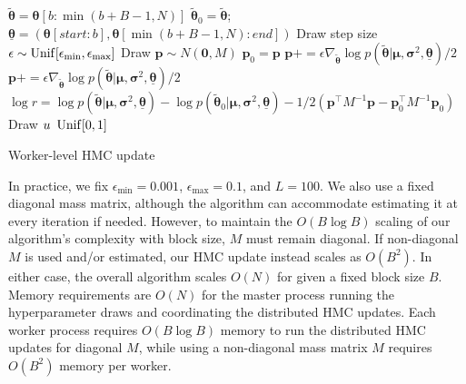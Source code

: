 \begin{algorithm}%

 $\bm{\tilde \theta} = \bm \theta[ b : \min(b + B - 1, N)]$\;
 $\bm{\tilde \theta}_0 = \bm{\tilde \theta}$;
 $\bm{\underline \theta} = (\bm \theta[start:b], \bm \theta[\min(b + B - 1, N):end])$\;
 Draw step size $\epsilon \sim \operatorname{Unif}[\epsilon_{\min}, \epsilon_{\max}]$\;
 Draw $\bm p \sim N(\bm 0, M)$\;
 $\bm p_0 = \bm p$\;
 $\bm p += \epsilon \nabla_{\bm{\tilde \theta}} \log p(\bm{\tilde \theta} | \bm \mu, \bm \sigma^2, \bm{\underline \theta}) / 2$\;
 $\bm p += \epsilon \nabla_{\bm{\tilde \theta}} \log p(\bm{\tilde \theta} | \bm \mu, \bm \sigma^2, \bm{\underline \theta}) / 2$\;
 $\log r = \log p(\bm{\tilde \theta} | \bm \mu, \bm \sigma^2, \bm{\underline \theta}) - \log p(\bm{\tilde \theta}_0 | \bm \mu, \bm \sigma^2, \bm{\underline \theta}) - 1/2( \bm p^\top M^{-1} \bm p - \bm p_0^\top M^{-1} \bm p_0)$\;
Draw $u ~ \operatorname{Unif}[0,1]$\;
 {
 
}
 \caption{Worker-level HMC update \label{alg:hmc}}
\end{algorithm}
%
In practice, we fix $\epsilon_{\min} = 0.001$, $\epsilon_{\max} = 0.1$, and $L = 100$.
We also use a fixed diagonal mass matrix, although the algorithm can accommodate estimating it at every iteration if needed.
However, to maintain the $O(B \log B)$ scaling of our algorithm's complexity with block size, $M$ must remain diagonal.
If non-diagonal $M$ is used and/or estimated, our HMC update instead scales as $O(B^2)$.
In either case, the overall algorithm scales $O(N)$ for given a fixed block size $B$.
%
Memory requirements are $O(N)$ for the master process running the hyperparameter draws and coordinating the distributed HMC updates.
Each worker process requires $O(B \log B)$ memory to run the distributed HMC updates for diagonal $M$, while using a non-diagonal mass matrix $M$ requires $O(B^2)$ memory per worker.


